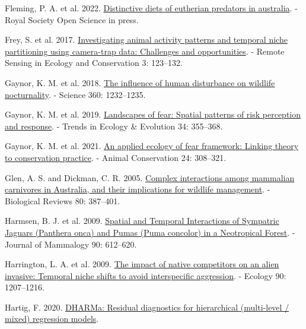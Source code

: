 \documentclass[preprint, 3p, authoryear]{elsarticle} %
\newlength{\cslhangindent}
\newlength{\cslentryspacingunit} %
\newenvironment{CSLReferences}[2] %
 {%
  \setlength{\parindent}{0pt}
  \ifodd #1
  \let\oldpar\par
  \def\par{\hangindent=\cslhangindent\oldpar}
  \fi
  \setlength{\parskip}{#2\cslentryspacingunit}
 }%
 {}
\begin{document}
\begin{CSLReferences}{1}{0}
\leavevmode{}%
Fleming, P. A. et al. 2022. \href{https://doi.org/10.1098/rsos.220792}{Distinctive diets of eutherian predators in australia}. - Royal Society Open Science in press.

\leavevmode{}%
Frey, S. et al. 2017. \href{https://doi.org/10.1002/rse2.60}{Investigating animal activity patterns and temporal niche partitioning using camera-trap data: Challenges and opportunities}. - Remote Sensing in Ecology and Conservation 3: 123--132.

\leavevmode{}%
Gaynor, K. M. et al. 2018. \href{https://doi.org/10.1126/science.aar7121}{The influence of human disturbance on wildlife nocturnality}. - Science 360: 1232--1235.

\leavevmode{}%
Gaynor, K. M. et al. 2019. \href{https://doi.org/10.1016/j.tree.2019.01.004}{Landscapes of fear: Spatial patterns of risk perception and response}. - Trends in Ecology \& Evolution 34: 355--368.

\leavevmode{}%
Gaynor, K. M. et al. 2021. \href{https://doi.org/10.1111/acv.12629}{An applied ecology of fear framework: Linking theory to conservation practice}. - Animal Conservation 24: 308--321.

\leavevmode{}%
Glen, A. S. and Dickman, C. R. 2005. \href{https://doi.org/10.1017/S1464793105006718}{Complex interactions among mammalian carnivores in {{A}ustralia}, and their implications for wildlife management}. - Biological Reviews 80: 387--401.

\leavevmode{}%
Harmsen, B. J. et al. 2009. \href{https://doi.org/10.1644/08-MAMM-A-140R.1}{{Spatial and Temporal Interactions of Sympatric Jaguars (Panthera onca) and Pumas (Puma concolor) in a Neotropical Forest}}. - Journal of Mammalogy 90: 612--620.

\leavevmode{}%
Harrington, L. A. et al. 2009. \href{https://doi.org/10.1890/08-0302.1}{The impact of native competitors on an alien invasive: Temporal niche shifts to avoid interspecific aggression}. - Ecology 90: 1207--1216.

\leavevmode{}%
Hartig, F. 2020. \href{https://CRAN.R-project.org/package=DHARMa}{DHARMa: Residual diagnostics for hierarchical (multi-level / mixed) regression models}.


\end{CSLReferences}
\end{document}
